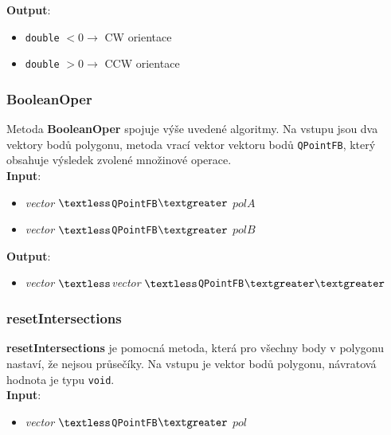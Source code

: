\documentclass[a4paper, 12pt]{article}
\begin{document}
\textbf{Output}:
\begin{itemize}
\item \texttt{double} $< 0 \rightarrow$ CW orientace
\item \texttt{double} $> 0 \rightarrow$ CCW orientace
\end{itemize}

\subsubsection*{BooleanOper}
Metoda \textbf{BooleanOper} spojuje výše uvedené algoritmy. Na vstupu jsou dva vektory bodů polygonu, metoda vrací vektor vektoru bodů \texttt{QPointFB}, který obsahuje výsledek zvolené množinové operace.\\

\textbf{Input}:
\begin{itemize}
\item \textsl{vector} $\textless$\texttt{QPointFB}$\textgreater$ $polA$
\item \textsl{vector} $\textless$\texttt{QPointFB}$\textgreater$ $polB$
\end{itemize}

\textbf{Output}:
\begin{itemize}
\item \textsl{vector} $\textless$\textsl{vector} $\textless$\texttt{QPointFB}$\textgreater \textgreater$
\end{itemize}

\subsubsection*{resetIntersections}
\textbf{resetIntersections} je pomocná metoda, která pro všechny body v polygonu nastaví, že nejsou průsečíky. Na vstupu je vektor bodů polygonu, návratová hodnota je typu \texttt{void}.\\

\textbf{Input}:
\begin{itemize}
\item \textsl{vector} $\textless$\texttt{QPointFB}$\textgreater$ $pol$
\end{itemize}
\end{document}
